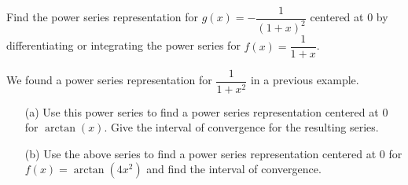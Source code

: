 \documentclass[12pt]{article}
\begin{document}
\newpage

\Example Find the power series representation for $g(x)=-\dfrac{1}{(1+x)^2}$ centered at $0$ by differentiating or integrating the power series for $f(x)=\dfrac{1}{1+x}$.

\vfill

\Example We found a power series representation for $\dfrac{1}{1+x^2}$ in a previous example.

\begin{enumerate}
\item[(a)] Use this power series to find a power series representation centered at $0$ for $\arctan(x)$. Give the interval of convergence for the resulting series.

\vfill

\item[(b)] Use the above series to find a power series representation centered at $0$ for $f(x)=\arctan(4x^2)$ and find the interval of convergence.

\vfill
\end{enumerate}
\end{document}
